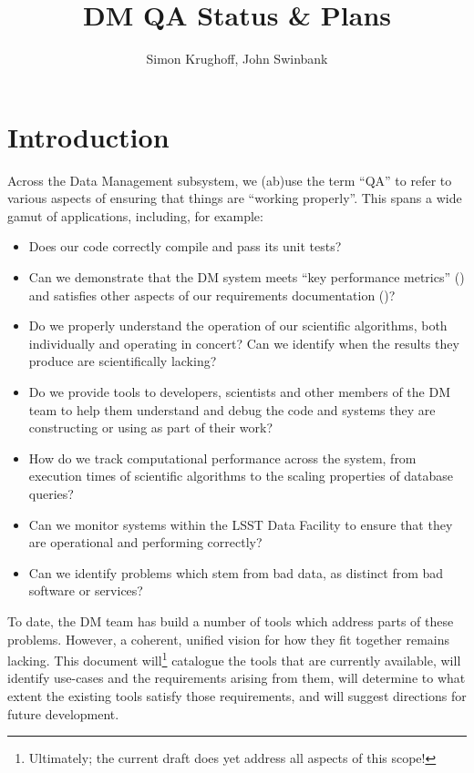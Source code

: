 \documentclass[DM,authoryear,toc,lsstdraft]{lsstdoc}
\title{DM QA Status \& Plans}
\author{%
Simon Krughoff,
John Swinbank
}
\date{\vcsDate}
\begin{document}
\maketitle

\section{Introduction}
\label{sec:intro}

Across the Data Management subsystem, we (ab)use the term ``QA'' to refer to
various aspects of ensuring that things are ``working properly''. This spans a
wide gamut of applications, including, for example:

\begin{itemize}

\item{Does our code correctly compile and pass its unit tests?}
\item{Can we demonstrate that the DM system meets ``key performance
metrics'' () and satisfies other aspects of our requirements
documentation ()?}
\item{Do we properly understand the operation of our scientific algorithms,
both individually and operating in concert? Can we identify when the results
they produce are scientifically lacking?}
\item{Do we provide tools to developers, scientists and other members of the
DM team to help them understand and debug the code and systems they are
constructing or using as part of their work?}
\item{How do we track computational performance across the system, from
execution times of scientific algorithms to the scaling properties of database
queries?}
\item{Can we monitor systems within the LSST Data Facility to ensure that they
are operational and performing correctly?}
\item{Can we identify problems which stem from bad data, as distinct from bad
software or services?}

\end{itemize}

To date, the DM team has build a number of tools which address parts of these
problems. However, a coherent, unified vision for how they fit together
remains lacking. This document will\footnote{Ultimately; the current draft
does yet address all aspects of this scope!} catalogue the tools that are currently
available, will identify use-cases and the requirements arising from them,
will determine to what extent the existing tools satisfy those requirements,
and will suggest directions for future development.
\end{document}
